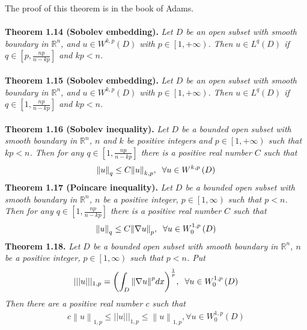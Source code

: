 \documentclass[a4paper]{article}
\numberwithin{equation}{section}
\begin{document}
The proof of this theorem is in the book of Adams.\\
\\
\textbf{Theorem 1.14 (Sobolev embedding).} \textit{Let $D$ be an open subset with smooth boundary in $\mathbb{R}^n$, and $u\in W^{k,p}\left(D\right)$ with $p\in \left[1,+\infty\right)$. Then $u \in L^q\left(D\right)$ if $q \in \left[ {p,\frac{{np}}{{n - kp}}} \right]$ and $kp < n$.}\\
\\
\textbf{Theorem 1.15 (Sobolev embedding).} \textit{Let $D$ be an open subset with smooth boundary in $\mathbb{R}^n$, and $u\in W^{k,p}\left(D\right)$ with $p\in \left[1,+\infty\right)$. Then $u \in L^q\left(D\right)$ if $q \in \left[ {1,\frac{{np}}{{n - kp}}} \right]$ and $kp < n$.}\\
\\
\textbf{Theorem 1.16 (Sobolev inequality).} \textit{Let $D$ be a bounded open subset with smooth boundary in $\mathbb{R}^n$, $n$ and $k$ be positive integers and $p\in \left[1,+\infty \right)$ such that $kp<n$. Then for any $q \in \left[ {1,\frac{{np}}{{n - kp}}} \right]$ there is a positive real number $C$ such that}
\begin{align}
{\left\| u \right\|_q} \le C{\left\| u \right\|_{k,p}},\hspace{0.2cm} \forall u \in {W^{k,p}}\left( D \right)
\end{align}
\textbf{Theorem 1.17 (Poincare inequality).} \textit{Let $D$ be a bounded open subset with smooth boundary in $\mathbb{R}^n$, $n$ be a positive integer, $p\in \left[1,\infty \right)$ such that $p<n$. Then for any $q \in \left[ {1,\frac{{np}}{{n - kp}}} \right]$ there is a positive real number $C$ such that}
\begin{align}
{\left\| u \right\|_q} \le C{\left\| {\nabla u} \right\|_p},\hspace{0.2cm}\forall u \in W_0^{1,p}\left( D \right)
\end{align}
\textbf{Theorem 1.18.} \textit{Let $D$ be a bounded open subset with smooth boundary in $\mathbb{R}^n$, $n$ be a positive integer, $p\in \left[1,\infty\right)$ such that $p<n$. Put}
\begin{align}
|||u||{|_{1,p}} = {\left( {\int_D {{{\left\| {\nabla u} \right\|}^p}dx} } \right)^{\frac{1}{p}}},\hspace{0.2cm}\forall u \in W_0^{1,p}\left( D \right)
\end{align}
\textit{Then there are a positive real number $c$ such that}
\begin{align}
c{\left\| u \right\|_{1,p}} \le ||u||{|_{1,p}} \le {\left\| u \right\|_{1,p}},\forall u \in W_0^{1,p}\left( D \right)
\end{align}
\end{document}
